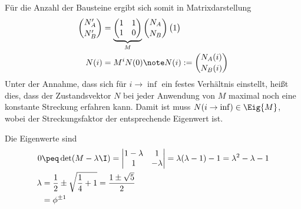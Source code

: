 \documentclass[exa]{exercise_5.0}
\begin{document}
Für die Anzahl der Bausteine ergibt sich somit in Matrixdarstellung
\begin{align*}
    \binom {N_A'}{N_B'} &= \underbrace{\begin{pmatrix}
        1&1\\
        1&0
    \end{pmatrix}}_M \binom {N_A}{N_B}\begin{pmatrix}
        1
    \end{pmatrix}\\
    N(i) &= M^i N(0)\note N(i):=\binom{N_A(i)}{N_B(i)}
\end{align*}
Unter der Annahme, dass sich für $i\to \inf$ ein festes Verhältnis einstellt, heißt dies, dass der Zustandsvektor $N$ bei jeder Anwendung von $M$ maximal noch eine konstante Streckung erfahren kann. Damit ist muss $N(i\to\inf)\in \Eig{M}$, wobei der Streckungsfaktor der entsprechende Eigenwert ist.  

Die Eigenwerte sind
\begin{align*}
    0 &\peq \det(M - \lambda \I) = \begin{vmatrix}
        1-\lambda & 1\\
        1 & -\lambda
    \end{vmatrix} = \lambda(\lambda-1) - 1= \lambda^2 - \lambda -1 \\
    \lambda &= \frac12 \pm \sqrt{\frac14 + 1} = \frac{1\pm \sqrt 5 }2\\ 
    &= \phi^{\pm 1}
\end{align*}

\label{A1}

\end{document}
